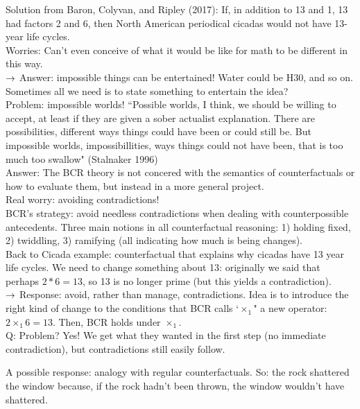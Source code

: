 Solution from Baron, Colyvan, and Ripley (2017): If, in addition to 13 and 1, 13 had factors 2 and 6, then North American periodical cicadas would not have 13-year life cycles. \\

Worries: Can't even conceive of what it would be like for math to be different in this way. \\

$\rightarrow$ Answer: impossible things can be entertained! Water could be H30, and so on. Sometimes all we need is to state something to entertain the idea? \\

Problem: impossible worlds! ``Possible worlds, I think, we should be willing to accept, at least if they are given a sober actualist explanation. There are possibilities, different ways things could have been or could still be. But impossible worlds, impossibillities, ways things could not have been, that is too much too swallow" (Stalnaker 1996) \\

Answer: The BCR theory is not concered with the semantics of counterfactuals or how to evaluate them, but instead in a more general project. \\

Real worry: avoiding contradictions! \\

BCR's strategy: avoid needless contradictions when dealing with counterpossible antecedents. Three main notions in all counterfactual reasoning: 1) holding fixed, 2) twiddling, 3) ramifying (all indicating how much is being changes). \\

Back to Cicada example: counterfactual that explains why cicadas have 13 year life cycles. We need to change something about 13: originally we said that perhaps $2*6=13$, so 13 is no longer prime (but this yields a contradiction). \\

$\rightarrow$ Response: avoid, rather than manage, contradictions. Idea is to introduce the right kind of change to the conditions that BCR calls `$\times_1$" a new operator: $2 \times_1 6 = 13$. Then, BCR holds under $\times_1$. \\

Q: Problem? Yes! We get what they wanted in the first step (no immediate contradiction), but contradictions still easily follow.

A possible response: analogy with regular counterfactuals. So: the rock shattered the window because, if the rock hadn't been thrown, the window wouldn't have shattered. \\

